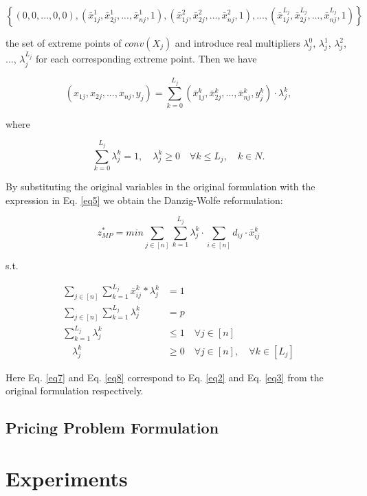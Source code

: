 \documentclass[
	11pt,
	DIV10,
	ngerman,
	a4paper,
	oneside,
	headings=normal,
	captions=tableheading,
	final,
	numbers=noenddot
]{scrartcl}
\begin{document}
\begin{equation}
	\left\{(0, 0, ..., 0, 0), (\bar{x}_{1j}^{1}, \bar{x}_{2j}^{1}, ..., \bar{x}_{nj}^{1}, 1), (\bar{x}_{1j}^{2}, \bar{x}_{2j}^{2}, ..., \bar{x}_{nj}^{2}, 1), ..., (\bar{x}_{1j}^{L_{j}}, \bar{x}_{2j}^{L_{j}}, ..., \bar{x}_{nj}^{L_{j}}, 1)\right\} \nonumber
\end{equation}

the set of extreme points of $ conv(X_{j}) $ and introduce real multipliers $ \lambda_{j}^{0} $, $ \lambda_{j}^{1} $, $ \lambda_{j}^{2} $, ..., $ \lambda_{j}^{L_{j}} $ for each corresponding extreme point. Then we have

\begin{equation}
	\label{eq5}
	(x_{1j}, x_{2j}, ..., x_{nj}, y_{j}) = \sum_{k = 0}^{L_{j}} (\bar{x}_{1j}^{k}, \bar{x}_{2j}^{k}, ..., \bar{x}_{nj}^{k}, y_{j}^{k}) \cdot \lambda_{j}^{k},
\end{equation}

where

\begin{equation}
	\sum_{k = 0}^{L_{j}} \lambda_{j}^{k} = 1, \quad \lambda_{j}^{k} \geq 0 \quad \forall k \leq L_{j}, \quad k \in N. \nonumber
\end{equation}

By substituting the original variables in the original formulation with the expression in Eq. \eqref{eq5} we obtain the Danzig-Wolfe reformulation:

\begin{equation}
	\label{eq6}
	z_{MP}^{*} = min \sum_{j \in [n]} \sum_{k = 1}^{L_{j}} \lambda_{j}^{k} \cdot \sum_{i \in [n]} d_{ij} \cdot \bar{x}_{ij}^{k}
\end{equation}

s.t.

\begin{align}
	\label{eq7} \sum_{j \in [n]} \sum_{k = 1}^{L_{j}} \bar{x}_{ij}^{k} * \lambda_{j}^{k} &= 1 \\[1em]
	\label{eq8} \sum_{j \in [n]} \sum_{k = 1}^{L_{j}} \lambda_{j}^{k} &= p \\[1em]
	\label{eq9} \sum_{k = 1}^{L_{j}} \lambda_{j}^{k} &\leq 1 \quad \forall j \in [n] \\[1em]
	\quad \lambda_{j}^{k} &\geq 0 \quad \forall j \in [n], \quad \forall k \in [L_{j}] \nonumber
\end{align}

Here Eq. \eqref{eq7} and Eq. \eqref{eq8} correspond to Eq. \eqref{eq2} and Eq. \eqref{eq3} from the original formulation respectively.

\subsection{Pricing Problem Formulation}



\section{Experiments}
\label{sec2}



\end{document}
